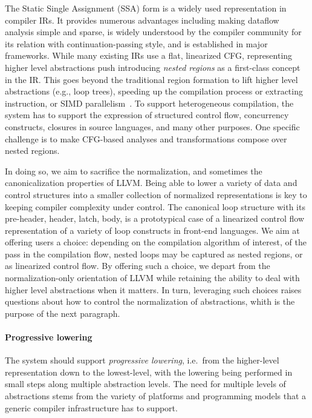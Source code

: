 The Static Single Assignment (SSA) form \cite{Cytron:1991:ECS:115372.115320} is a
widely used representation
in compiler IRs.  It provides numerous advantages including making dataflow
analysis simple and sparse, is widely understood by the compiler community for its relation with continuation-passing style,
and is established in major frameworks.  While many existing IRs use a flat, linearized
CFG, representing higher level abstractions push introducing \emph{nested
regions} as a first-class concept in the IR.
This goes beyond the traditional region formation to lift higher level abstractions (e.g., loop trees), speeding up the compilation process or extracting instruction, or SIMD parallelism~\cite{Johnson:1994:PST:178243.178258,DBLP:conf/hpca/HavankiBC98,DBLP:journals/toplas/Ramalingam02}. To support heterogeneous compilation, the system has to support
the expression of structured control flow, concurrency constructs,
closures in source languages, and many other purposes. One specific challenge is to make CFG-based analyses and transformations compose over nested regions.

In doing so, we aim to sacrifice the normalization, and sometimes the canonicalization properties of LLVM. Being able to lower a variety of data and control structures into a smaller collection of normalized representations is key to keeping compiler complexity under control. The canonical loop structure with its pre-header, header, latch, body, is a prototypical case of a linearized control flow representation of a variety of loop constructs in front-end languages. We aim at offering users a choice: depending on the compilation algorithm of interest, of the pass in the compilation flow, nested loops may be captured as nested regions, or as linearized control flow. By offering such a choice, we depart from the normalization-only orientation of LLVM while retaining the ability to deal with higher level abstractions when it matters. In turn, leveraging such choices raises questions about how to control the normalization of abstractions, whith is the purpose of the next paragraph.

\paragraph{Progressive lowering}

The system should support \emph{progressive lowering}, i.e.\ from the
higher-level representation down to the lowest-level, with the lowering being performed
in small steps along multiple abstraction levels. The need for multiple levels
of abstractions stems from the variety of platforms and programming models that
a generic compiler infrastructure has to support.

